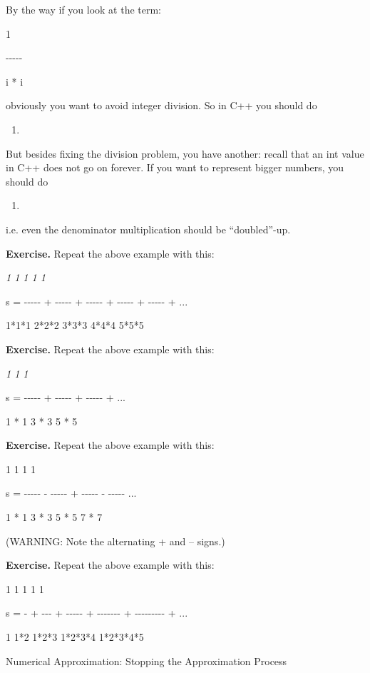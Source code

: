 \documentclass[
]{article}
\begin{document}
By the way if you look at the term:

1

-\/-\/-\/-\/-

i * i

obviously you want to avoid integer division. So in C++ you should do

\begin{enumerate}
\def\labelenumi{\arabic{enumi}.}
\item
\end{enumerate}

But besides fixing the division problem, you have another: recall that
an int value in C++ does not go on forever. If you want to represent
bigger numbers, you should do

\begin{enumerate}
\def\labelenumi{\arabic{enumi}.}
\item
\end{enumerate}

i.e. even the denominator multiplication should be ``doubled''-up.

\textbf{Exercise. }Repeat the above example with this:

\emph{ 1 1 1 1 1}

s = -\/-\/-\/-\/- + -\/-\/-\/-\/- + -\/-\/-\/-\/- + -\/-\/-\/-\/- +
-\/-\/-\/-\/- + ...

1*1*1 2*2*2 3*3*3 4*4*4 5*5*5

\textbf{Exercise. }Repeat the above example with this:

\emph{ 1 1 1 }

s = -\/-\/-\/-\/- + -\/-\/-\/-\/- + -\/-\/-\/-\/- + ...

1 * 1 3 * 3 5 * 5

\textbf{Exercise. }Repeat the above example with this:

1 1 1 1

s = -\/-\/-\/-\/- - -\/-\/-\/-\/- + -\/-\/-\/-\/- - -\/-\/-\/-\/- ...

1 * 1 3 * 3 5 * 5 7 * 7

(WARNING: Note the alternating + and -- signs.)

\textbf{Exercise. }Repeat the above example with this:

1 1 1 1 1

s = - + -\/-\/- + -\/-\/-\/-\/- + -\/-\/-\/-\/-\/-\/- +
-\/-\/-\/-\/-\/-\/-\/-\/- + ...

1 1*2 1*2*3 1*2*3*4 1*2*3*4*5

Numerical Approximation: Stopping the Approximation Process
\end{document}
